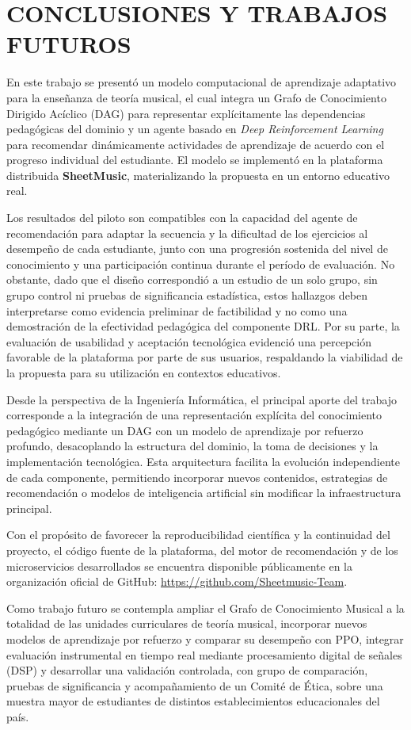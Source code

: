 \section{CONCLUSIONES Y TRABAJOS FUTUROS}

En este trabajo se presentó un modelo computacional de aprendizaje adaptativo para la enseñanza de teoría musical, el cual integra un Grafo de Conocimiento Dirigido Acíclico (DAG) para representar explícitamente las dependencias pedagógicas del dominio y un agente basado en \textit{Deep Reinforcement Learning} para recomendar dinámicamente actividades de aprendizaje de acuerdo con el progreso individual del estudiante. El modelo se implementó en la plataforma distribuida \textbf{SheetMusic}, materializando la propuesta en un entorno educativo real.

Los resultados del piloto son compatibles con la capacidad del agente de recomendación para adaptar la secuencia y la dificultad de los ejercicios al desempeño de cada estudiante, junto con una progresión sostenida del nivel de conocimiento y una participación continua durante el período de evaluación. No obstante, dado que el diseño correspondió a un estudio de un solo grupo, sin grupo control ni pruebas de significancia estadística, estos hallazgos deben interpretarse como evidencia preliminar de factibilidad y no como una demostración de la efectividad pedagógica del componente DRL. Por su parte, la evaluación de usabilidad y aceptación tecnológica evidenció una percepción favorable de la plataforma por parte de sus usuarios, respaldando la viabilidad de la propuesta para su utilización en contextos educativos.

Desde la perspectiva de la Ingeniería Informática, el principal aporte del trabajo corresponde a la integración de una representación explícita del conocimiento pedagógico mediante un DAG con un modelo de aprendizaje por refuerzo profundo, desacoplando la estructura del dominio, la toma de decisiones y la implementación tecnológica. Esta arquitectura facilita la evolución independiente de cada componente, permitiendo incorporar nuevos contenidos, estrategias de recomendación o modelos de inteligencia artificial sin modificar la infraestructura principal.

Con el propósito de favorecer la reproducibilidad científica y la continuidad del proyecto, el código fuente de la plataforma, del motor de recomendación y de los microservicios desarrollados se encuentra disponible públicamente en la organización oficial de GitHub: \url{https://github.com/Sheetmusic-Team}.

Como trabajo futuro se contempla ampliar el Grafo de Conocimiento Musical a la totalidad de las unidades curriculares de teoría musical, incorporar nuevos modelos de aprendizaje por refuerzo y comparar su desempeño con PPO, integrar evaluación instrumental en tiempo real mediante procesamiento digital de señales (DSP) y desarrollar una validación controlada, con grupo de comparación, pruebas de significancia y acompañamiento de un Comité de Ética, sobre una muestra mayor de estudiantes de distintos establecimientos educacionales del país.